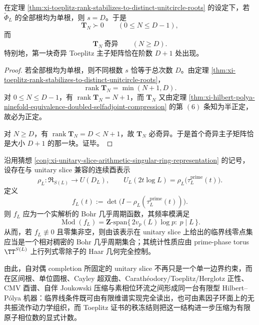 \begin{corollary}\label{cor:xi-toeplitz-first-singular-principal-minor-simple-spectrum}
在定理 \ref{thm:xi-toeplitz-rank-stabilizes-to-distinct-unitcircle-roots} 的设定下，若 \(\widetilde\Phi_L\) 的全部根均为单根，则 \(s=D\)。于是
\[
\mathbf{T}_N\succ 0
\qquad(0\le N\le D-1),
\]
而
\[
\mathbf{T}_N\ \text{奇异}
\qquad(N\ge D).
\]
特别地，第一块奇异 Toeplitz 主子矩阵恰在阶数 \(D+1\) 处出现。
\end{corollary}
\begin{proof}
若全部根均为单根，则不同根数 \(s\) 恰等于总次数 \(D\)。由定理 \ref{thm:xi-toeplitz-rank-stabilizes-to-distinct-unitcircle-roots}，
\[
\operatorname{rank}\mathbf{T}_N=\min(N+1,D).
\]
对 \(0\le N\le D-1\)，有 \(\operatorname{rank}\mathbf{T}_N=N+1\)，而 \(\mathbf{T}_N\) 又由定理 \ref{thm:xi-hilbert-polya-ninefold-equivalence-doubled-selfadjoint-compression} 的第 \((6)\) 条知为半正定，故必为正定。

对 \(N\ge D\)，有 \(\operatorname{rank}\mathbf{T}_N=D<N+1\)，故 \(\mathbf{T}_N\) 必奇异。于是首个奇异主子矩阵恰是大小 \(D+1\) 的那一块。证毕。
\end{proof}

\begin{conjecture}\label{conj:xi-prime-phase-bohr-almost-periodic-zero-geometry}
沿用猜想 \ref{conj:xi-unitary-slice-arithmetic-singular-ring-representation} 的记号，设存在与 unitary slice 兼容的连续酉表示
\[
\rho_L:\mathfrak{R}_{S(L)}\to U(D_L),
\qquad
U_L(2t\log L)=\rho_L\bigl(\tau_L^{\mathrm{prime}}(t)\bigr).
\]
定义
\[
f_L(t):=\det\!\bigl(I-\rho_L(\tau_L^{\mathrm{prime}}(t))\bigr).
\]
则 \(f_L\) 应为一个实解析的 Bohr 几乎周期函数，其频率模满足
\[
\operatorname{Mod}(f_L)
=
\mathbf Z\text{-span}\bigl\{\,2v_p(L)\log p:\ p\mid L\,\bigr\}.
\]
从而，若 \(f_L\not\equiv 0\) 且零集非空，则由该表示在 unitary slice 上给出的临界线零点集应当是一个相对稠密的 Bohr 几乎周期集合；其统计性质应由 prime-phase torus \(\TT^{S(L)}\) 上行列式零除子的 Haar 几何完全控制。
\end{conjecture}

\noindent
由此，自对偶 completion 所固定的 unitary slice 不再只是一个单一边界约束，而在区间根、单位圆根、Cayley 超双曲、Carath\'eodory/Toeplitz/Herglotz 正性、CMV 酉谱、自伴 Joukowski 压缩与素相位环流之间形成同一台有限型 Hilbert--P{\'o}lya 机器：临界线条件既可由有限维谱实现完全读出，也可由素因子环面上的无共振流作动力学组织，而 Toeplitz 证书的秩冻结则把这一结构进一步压缩为有限原子相位数的显式计数。

\endinput
